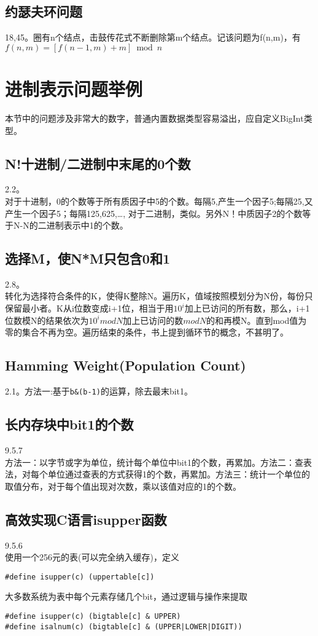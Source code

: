 \label{subsec:dupNumberInFile}

\subsection{约瑟夫环问题}
\cite{ms100}18,\cite{sword}45。圈有n个结点，击鼓传花式不断删除第m个结点。记该问题为f(n,m)，有 $f(n,m)=[f(n-1,m)+m]\bmod n$




\section{进制表示问题举例}
本节中的问题涉及非常大的数字，普通内置数据类型容易溢出，应自定义BigInt类型。
\subsection{N!十进制/二进制中末尾的0个数}
\cite{bop}2.2。\\
对于十进制，0的个数等于所有质因子中5的个数。每隔5,产生一个因子5;每隔25,又产生一个因子5；每隔125,625,\ldots,
对于二进制，类似。另外N！中质因子2的个数等于N-N的二进制表示中1的个数。
\subsection{选择M，使N*M只包含0和1}
\cite{bop}2.8。\\转化为选择符合条件的K，使得K整除N。遍历K，值域按照模划分为N份，每份只保留最小者。K从i位数变成i+1位，相当于用$10^i$加上已访问的所有数，那么，i+1位数模N的结果依次为$10^i mod N$加上已访问的数$mod N$的和再模N。直到mod值为零的集合不再为空。遍历结束的条件，书上提到循环节的概念，不甚明了。

\subsection{Hamming Weight(Population Count)}
\cite{bop}2.1。方法一:基于\verb|b&(b-1)|的运算，除去最末bit1。

\subsection{长内存块中bit1的个数}
\cite{pp}9.5.7\\
方法一：以字节或字为单位，统计每个单位中bit1的个数，再累加。方法二：查表法，对每个单位通过查表的方式获得1的个数，再累加。方法三：统计一个单位的取值分布，对于每个值出现对次数，乘以该值对应的1的个数。

\subsection{高效实现C语言isupper函数}
\cite{pp}9.5.6\\
使用一个256元的表(可以完全纳入缓存)，定义
\begin{verbatim}
#define isupper(c) (uppertable[c])
\end{verbatim}
大多数系统为表中每个元素存储几个bit，通过逻辑与操作来提取
\begin{verbatim}
#define isupper(c) (bigtable[c] & UPPER)
#define isalnum(c) (bigtable[c] & (UPPER|LOWER|DIGIT))
\end{verbatim}




